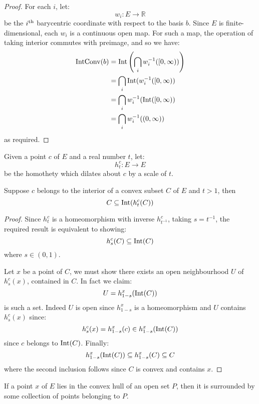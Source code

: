 \begin{proof}
  \leanok
  For each $i$, let:
  \[
    w_i : E \to ℝ
  \]
  be the $i^{\rm th}$ barycentric coordinate with respect to the basis $b$.
  Since $E$ is finite-dimensional, each $w_i$ is a continuous open map. For
  such a map, the operation of taking interior commutes with preimage, and so
  we have:
  \begin{align*}
    \operatorname{IntConv}(b) &= \operatorname{Int}\left(\bigcap_i w_i^{-1}([0, \infty))\right)\\
                &= \bigcap_i \operatorname{Int}(w_i^{-1}([0, \infty))\\
                &= \bigcap_i w_i^{-1}(\operatorname{Int}([0, \infty))\\
                &= \bigcap_i w_i^{-1}((0, \infty))
  \end{align*}
  as required.
\end{proof}

\begin{lemma}
  \label{lem:int_homothety_cvx}
  \leanok
  Given a point $c$ of $E$ and a real number $t$, let:
  \[
    h^c_t : E \to E
  \]
  be the homothety which dilates about $c$ by a scale of $t$.

  Suppose $c$ belongs to the interior of a convex subset $C$ of $E$
  and $t > 1$, then
  \[
    C \subseteq \operatorname{Int}(h^c_t(C))
  \]
\end{lemma}

\begin{proof}
  \leanok
  Since $h^c_t$ is a homeomorphism with inverse $h^c_{t^{-1}}$, taking $s = t^{-1}$,
  the required result is equivalent to showing:
  \[
    h^c_s(C) \subseteq \operatorname{Int}(C)
  \]
  where $s \in (0, 1)$.

  Let $x$ be a point of $C$, we must show there exists an open neighbourhood $U$
  of $h^c_s(x)$, contained in $C$. In fact we claim:
  \[
    U = h^x_{1-s}(\operatorname{Int}(C))
  \]
  is such a set. Indeed $U$ is open since $h^x_{1-s}$ is a homeomorphism and $U$
  contains $h^c_s(x)$ since:
  \[
    h^c_s(x) = h^x_{1-s}(c) \in h^x_{1-s}(\operatorname{Int}(C))
  \]
  since $c$ belongs to $\operatorname{Int}(C)$. Finally:
  \[
    h^x_{1-s}(\operatorname{Int}(C)) \subseteq h^x_{1-s}(C) \subseteq C
  \]
  where the second inclusion follows since $C$ is convex and contains $x$.
\end{proof}

\begin{lemma}
  \label{lem:int_cvx}
  \leanok
  If a point $x$ of $E$ lies in the convex hull of an open set $P$,
  then it is surrounded by some collection of points belonging to $P$.
\end{lemma}

